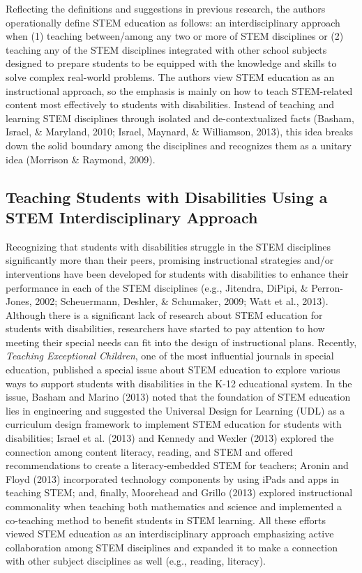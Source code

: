 \documentclass[11.5pt]{sig-alternate} %
\begin{document}
\begin{large}
 Reflecting the definitions and suggestions in previous research, the authors operationally define STEM education as follows: an interdisciplinary approach when (1) teaching between/among any two or more of STEM disciplines or (2) teaching any of the STEM disciplines integrated with other school subjects designed to prepare students to be equipped with the knowledge and skills to solve complex real-world problems.  The authors view STEM education as an instructional approach, so the emphasis is mainly on how to teach STEM-related content most effectively to students with disabilities.  Instead of teaching and learning STEM disciplines through isolated and de-contextualized facts (Basham, Israel, \& Maryland, 2010; Israel, Maynard, \& Williamson, 2013), this idea breaks down the solid boundary among the disciplines and recognizes them as a unitary idea (Morrison \& Raymond, 2009). 

\subsection*{Teaching Students with Disabilities Using a STEM Interdisciplinary Approach}

Recognizing that students with disabilities struggle in the STEM disciplines significantly more than their peers, promising instructional strategies and/or interventions have been developed for students with disabilities to enhance their performance in each of the STEM disciplines (e.g., Jitendra, DiPipi, \& Perron-Jones, 2002; Scheuermann, Deshler, \& Schumaker, 2009; Watt et al., 2013). Although there is a significant lack of research about STEM education for students with disabilities, researchers have started to pay attention to how meeting their special needs can fit into the design of instructional plans. Recently, \textit{Teaching Exceptional Children}, one of the most influential journals in special education, published a special issue about STEM education to explore various ways to support students with disabilities in the K-12 educational system. In the issue, Basham and Marino (2013) noted that the foundation of STEM education lies in engineering and suggested the Universal Design for Learning (UDL) as a curriculum design framework to implement STEM education for students with disabilities; Israel et al. (2013) and Kennedy and Wexler (2013) explored the connection among content literacy, reading, and STEM and offered recommendations to create a literacy-embedded STEM for teachers; Aronin and Floyd (2013) incorporated technology components by using iPads and apps in teaching STEM; and, finally, Moorehead and Grillo (2013) explored instructional commonality when teaching both mathematics and science and implemented a co-teaching method to benefit students in STEM learning. All these efforts viewed STEM education as an interdisciplinary approach emphasizing active collaboration among STEM disciplines and expanded it to make a connection with other subject disciplines as well (e.g., reading, literacy). 	


\end{large}
\end{document}
